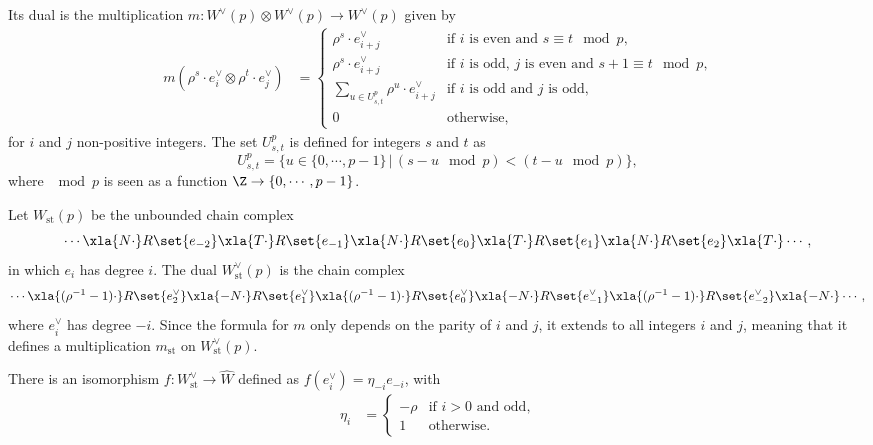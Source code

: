 Its dual is the multiplication $m\colon W^\vee(p)\otimes W^\vee(p)\to W^\vee(p)$ given by
\begin{align*}
	m(\rho^s \cdot e^\vee_i\otimes \rho^t \cdot e^\vee_j)&= \begin{cases}
	\rho^s \cdot e^\vee_{i+j}& \text{if $i$ is even and $s\equiv t \mod p$,}
	\\
	\rho^s \cdot e^\vee_{i+j}& \text{if $i$ is odd, $j$ is even and $s+1\equiv t \mod p$,}
	\\
	\sum_{u\in U^p_{s,t}}\rho^u\cdot e^\vee_{i+j} & \text{if $i$ is odd and $j$ is odd,}
	\\
	0&\text{otherwise,}
	\end{cases}
\end{align*}
for $i$ and $j$ non-positive integers. The set $U^p_{s,t}$ is defined for integers $s$ and $t$ as 
\[
U^p_{s,t}=\{u\in\{0,\cdots,p-1\}\, |\,  (s-u \mod p) < (t-u \mod p)\},
\]
where $\mod p$ is seen as a function $\Z\to \{0,\cdots,p-1\}$.

Let $W_{\text{st}}(p)$ be the unbounded chain complex
\[
 \cdots \xla{N\cdot} R\set{e_{-2}} \xla{T\cdot} R\set{e_{-1}} \xla{N\cdot} R\set{e_0} \xla{T\cdot} R\set{e_1} \xla{N\cdot} R\set{e_2} \xla{T\cdot} \cdots,
\]
in which $e_i$ has degree $i$. The dual $W_{\text{st}}^\vee(p)$ is the chain complex 
\[
 \cdots \xla{(\rho^{-1}-1)\cdot} R\set{e_{2}^\vee} \xla{-N\cdot} R\set{e_{1}^\vee} \xla{(\rho^{-1}-1)\cdot} R\set{e_0^\vee} \xla{-N\cdot} R\set{e_{-1}^\vee} \xla{(\rho^{-1}-1)\cdot} R\set{e_{-2}^\vee} \xla{-N\cdot} \cdots,
\]
where $e_i^\vee$ has degree $-i$. Since the formula for $m$ only depends on the parity of $i$ and $j$, it extends to all integers $i$ and $j$, meaning that it defines a multiplication $m_{\text{st}}$ on $W^\vee_{\text{st}}(p)$.

There is an isomorphism $f\colon W^\vee_{\text{st}}\to \widehat W$ defined as $f(e^\vee_i)=\eta_{-i}e_{-i}$, with
\begin{align*}
	\eta_i&= \begin{cases}
	-\rho & \text{if $i>0$ and odd,}
	\\
	1 &\text{otherwise.}
	\end{cases}
\end{align*}

